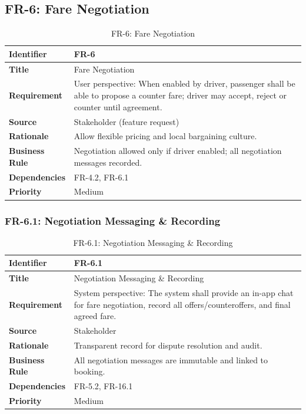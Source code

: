 \subsection{FR-6: Fare Negotiation}

\begin{longtable}{|p{3cm}|p{12cm}|}
\caption{FR-6: Fare Negotiation}
\label{tab:fr-6} \\
\hline
\rowcolor{lightgray!30}
\textbf{Identifier} & FR-6 \\
\hline
\textbf{Title} & Fare Negotiation \\
\hline
\textbf{Requirement} & User perspective: When enabled by driver, passenger shall be able to propose a counter fare; driver may accept, reject or counter until agreement. \\
\hline
\textbf{Source} & Stakeholder (feature request) \\
\hline
\textbf{Rationale} & Allow flexible pricing and local bargaining culture. \\
\hline
\textbf{Business Rule} & Negotiation allowed only if driver enabled; all negotiation messages recorded. \\
\hline
\textbf{Dependencies} & FR-4.2, FR-6.1 \\
\hline
\textbf{Priority} & Medium \\
\hline
\end{longtable}

\subsubsection{FR-6.1: Negotiation Messaging \& Recording}

\begin{longtable}{|p{3cm}|p{12cm}|}
\caption{FR-6.1: Negotiation Messaging \& Recording}
\label{tab:fr-6-1} \\
\hline
\rowcolor{lightgray!30}
\textbf{Identifier} & FR-6.1 \\
\hline
\textbf{Title} & Negotiation Messaging \& Recording \\
\hline
\textbf{Requirement} & System perspective: The system shall provide an in-app chat for fare negotiation, record all offers/counteroffers, and final agreed fare. \\
\hline
\textbf{Source} & Stakeholder \\
\hline
\textbf{Rationale} & Transparent record for dispute resolution and audit. \\
\hline
\textbf{Business Rule} & All negotiation messages are immutable and linked to booking. \\
\hline
\textbf{Dependencies} & FR-5.2, FR-16.1 \\
\hline
\textbf{Priority} & Medium \\
\hline
\end{longtable}

